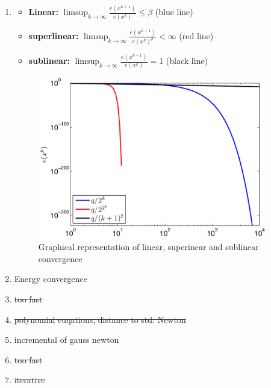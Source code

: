 \documentclass{report}
\begin{document}
\begin{enumerate}
\begin{itemize}
\begin{itemize}
	\end{itemize}
\end{itemize}

\item 
\begin{itemize}
	\item \textbf{Linear:} $\limsup_{k \rightarrow \infty} \frac{e(x^{k+1})}{e(x^k)}\leq \beta$ (blue line)
	\item \textbf{superlinear:} $\limsup_{k \rightarrow \infty} \frac{e(x^{k+1})}{e(x^k)^p} < \infty$ (red line)
	\item \textbf{sublinear:} $\limsup_{k \rightarrow \infty} \frac{e(x^{k+1})}{e(x^k)} = 1$ (black line)
\end{itemize}

\begin{figure}[H]
\includegraphics[width=10cm]{convergence.png}
\caption{Graphical representation of linear, superinear and sublinear convergence \label{fig:desc_dir}}
\end{figure}
\item Energy convergence 
\item \sout{too fast}
\item \sout{polynomial euqations, distance to std. Newton}
\item incremental of gauss newton
\item \sout{too fast}
\item \sout{iterative}

\end{enumerate}
\end{document}

